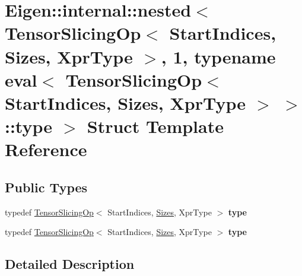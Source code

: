 \hypertarget{struct_eigen_1_1internal_1_1nested_3_01_tensor_slicing_op_3_01_start_indices_00_01_sizes_00_01_xd420115a29e780890854e1fb453a6b2f}{}\section{Eigen\+:\+:internal\+:\+:nested$<$ Tensor\+Slicing\+Op$<$ Start\+Indices, Sizes, Xpr\+Type $>$, 1, typename eval$<$ Tensor\+Slicing\+Op$<$ Start\+Indices, Sizes, Xpr\+Type $>$ $>$\+:\+:type $>$ Struct Template Reference}
\label{struct_eigen_1_1internal_1_1nested_3_01_tensor_slicing_op_3_01_start_indices_00_01_sizes_00_01_xd420115a29e780890854e1fb453a6b2f}
\subsection*{Public Types}
\begin{DoxyCompactItemize}
\item 
\mbox{\label{struct_eigen_1_1internal_1_1nested_3_01_tensor_slicing_op_3_01_start_indices_00_01_sizes_00_01_xd420115a29e780890854e1fb453a6b2f_aa9e073ce759dab6250f172cb70eab959}} 
typedef \hyperlink{class_eigen_1_1_tensor_slicing_op}{Tensor\+Slicing\+Op}$<$ Start\+Indices, \hyperlink{struct_eigen_1_1_sizes}{Sizes}, Xpr\+Type $>$ {\bfseries type}
\item 
\mbox{\label{struct_eigen_1_1internal_1_1nested_3_01_tensor_slicing_op_3_01_start_indices_00_01_sizes_00_01_xd420115a29e780890854e1fb453a6b2f_aa9e073ce759dab6250f172cb70eab959}} 
typedef \hyperlink{class_eigen_1_1_tensor_slicing_op}{Tensor\+Slicing\+Op}$<$ Start\+Indices, \hyperlink{struct_eigen_1_1_sizes}{Sizes}, Xpr\+Type $>$ {\bfseries type}
\end{DoxyCompactItemize}


\subsection{Detailed Description}
